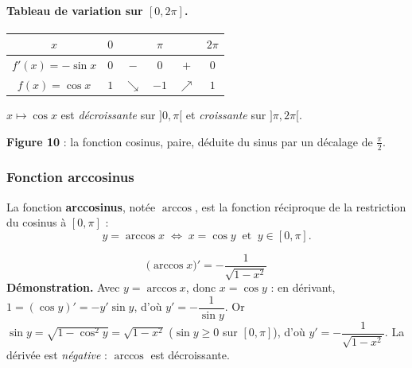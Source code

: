 \documentclass[11pt,a4paper]{article}
\newcommand{\croit}{\textcolor{varcol}{\Large$\nearrow$}}
\newcommand{\decroit}{\textcolor{varcol}{\Large$\searrow$}}
\begin{document}
\paragraph{Tableau de variation sur $[0,2\pi]$.}
\begin{center}
\renewcommand{\arraystretch}{1.6}\setlength{\tabcolsep}{12pt}
\begin{tabular}{|c|ccccc|}
\hline
\rowcolor{primarylight}
$x$ & $0$ & & $\pi$ & & $2\pi$ \\
\hline
$f'(x)=-\sin x$ & $0$ & $-$ & $0$ & $+$ & $0$ \\
\hline
$f(x)=\cos x$ & $1$ & \decroit & $-1$ & \croit & $1$ \\
\hline
\end{tabular}
\end{center}
$x\mapsto\cos x$ est \emph{décroissante} sur $]0,\pi[$ et \emph{croissante} sur $]\pi,2\pi[$.

\begin{center}
\textbf{\textcolor{primary}{Figure 10}} : la fonction cosinus, paire, déduite du sinus par un décalage de $\frac{\pi}{2}$.
\end{center}

\subsubsection{Fonction arccosinus}

\begin{definition}
La fonction \textbf{arccosinus}, notée $\arccos$, est la fonction réciproque de la
restriction du cosinus à $[0,\pi]$ :
\[
  y=\arccos x \;\Longleftrightarrow\; x=\cos y \ \text{ et } \ y\in[0,\pi].
\]
\end{definition}

\begin{formule}
\[
  \boxed{\;\big(\arccos x\big)'=-\dfrac{1}{\sqrt{1-x^2}}\;}
\]
\textbf{Démonstration.} Avec $y=\arccos x$, donc $x=\cos y$ : en dérivant,
$1=(\cos y)'=-y'\sin y$, d'où $y'=-\dfrac{1}{\sin y}$. Or
$\sin y=\sqrt{1-\cos^2 y}=\sqrt{1-x^2}$ ($\sin y\geq 0$ sur $[0,\pi]$), d'où
$y'=-\dfrac{1}{\sqrt{1-x^2}}$. La dérivée est \emph{négative} : $\arccos$ est décroissante.
\end{formule}
\end{document}
